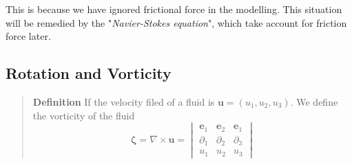 This is because we have ignored frictional force in the modelling. This situation will be remedied by the "\textit{Navier-Stokes equation}", which take account for friction force later.

\subsection{Rotation and Vorticity} %

\begin{quote}
	\textbf{Definition}
If the velocity filed of a fluid is $\textbf{u}=(u_1,u_2,u_3)$. We define the vorticity of the fluid
\begin{equation}
\mathbf{\zeta} = \nabla \times \textbf{u}
= \begin{vmatrix}
\textbf{e}_1 & \textbf{e}_2 & \textbf{e}_1\\
\partial_{1} & \partial_{2} & \partial_{3}\\
u_1 & u_2 & u_3
\end{vmatrix}
\end{equation}

\end{quote}
